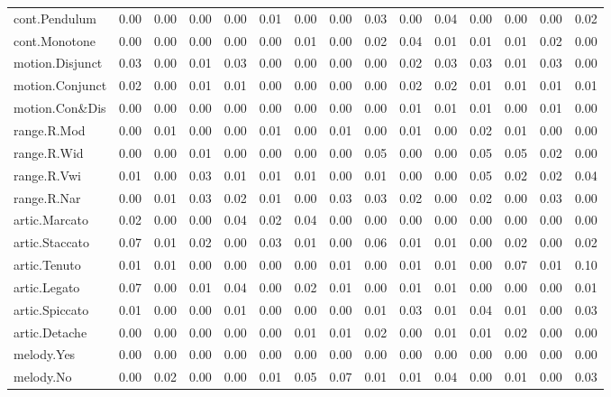 \documentclass[
]{article}
\newenvironment{lltable}{\begin{landscape}\begin{center}\begin{ThreePartTable}}{\end{ThreePartTable}\end{center}\end{landscape}}
\begin{document}
\begin{lltable}
{\begin{longtable}{lllllllllllllll}
cont.Pendulum & 0.00 & 0.00 & 0.00 & 0.00 & 0.01 & 0.00 & 0.00 & 0.03 & 0.00 & 0.04 & 0.00 & 0.00 & 0.00 & 0.02\\
cont.Monotone & 0.00 & 0.00 & 0.00 & 0.00 & 0.00 & 0.01 & 0.00 & 0.02 & 0.04 & 0.01 & 0.01 & 0.01 & 0.02 & 0.00\\
motion.Disjunct & 0.03 & 0.00 & 0.01 & 0.03 & 0.00 & 0.00 & 0.00 & 0.00 & 0.02 & 0.03 & 0.03 & 0.01 & 0.03 & 0.00\\
motion.Conjunct & 0.02 & 0.00 & 0.01 & 0.01 & 0.00 & 0.00 & 0.00 & 0.00 & 0.02 & 0.02 & 0.01 & 0.01 & 0.01 & 0.01\\
motion.Con\&Dis & 0.00 & 0.00 & 0.00 & 0.00 & 0.00 & 0.00 & 0.00 & 0.00 & 0.01 & 0.01 & 0.01 & 0.00 & 0.01 & 0.00\\
range.R.Mod & 0.00 & 0.01 & 0.00 & 0.00 & 0.01 & 0.00 & 0.01 & 0.00 & 0.01 & 0.00 & 0.02 & 0.01 & 0.00 & 0.00\\
range.R.Wid & 0.00 & 0.00 & 0.01 & 0.00 & 0.00 & 0.00 & 0.00 & 0.05 & 0.00 & 0.00 & 0.05 & 0.05 & 0.02 & 0.00\\
range.R.Vwi & 0.01 & 0.00 & 0.03 & 0.01 & 0.01 & 0.01 & 0.00 & 0.01 & 0.00 & 0.00 & 0.05 & 0.02 & 0.02 & 0.04\\
range.R.Nar & 0.00 & 0.01 & 0.03 & 0.02 & 0.01 & 0.00 & 0.03 & 0.03 & 0.02 & 0.00 & 0.02 & 0.00 & 0.03 & 0.00\\
artic.Marcato & 0.02 & 0.00 & 0.00 & 0.04 & 0.02 & 0.04 & 0.00 & 0.00 & 0.00 & 0.00 & 0.00 & 0.00 & 0.00 & 0.00\\
artic.Staccato & 0.07 & 0.01 & 0.02 & 0.00 & 0.03 & 0.01 & 0.00 & 0.06 & 0.01 & 0.01 & 0.00 & 0.02 & 0.00 & 0.02\\
artic.Tenuto & 0.01 & 0.01 & 0.00 & 0.00 & 0.00 & 0.00 & 0.01 & 0.00 & 0.01 & 0.01 & 0.00 & 0.07 & 0.01 & 0.10\\
artic.Legato & 0.07 & 0.00 & 0.01 & 0.04 & 0.00 & 0.02 & 0.01 & 0.00 & 0.01 & 0.01 & 0.00 & 0.00 & 0.00 & 0.01\\
artic.Spiccato & 0.01 & 0.00 & 0.00 & 0.01 & 0.00 & 0.00 & 0.00 & 0.01 & 0.03 & 0.01 & 0.04 & 0.01 & 0.00 & 0.03\\
artic.Detache & 0.00 & 0.00 & 0.00 & 0.00 & 0.00 & 0.01 & 0.01 & 0.02 & 0.00 & 0.01 & 0.01 & 0.02 & 0.00 & 0.00\\
melody.Yes & 0.00 & 0.00 & 0.00 & 0.00 & 0.00 & 0.00 & 0.00 & 0.00 & 0.00 & 0.00 & 0.00 & 0.00 & 0.00 & 0.00\\
melody.No & 0.00 & 0.02 & 0.00 & 0.00 & 0.01 & 0.05 & 0.07 & 0.01 & 0.01 & 0.04 & 0.00 & 0.01 & 0.00 & 0.03\\
\bottomrule
\end{longtable}

}

\end{lltable}
\end{document}
